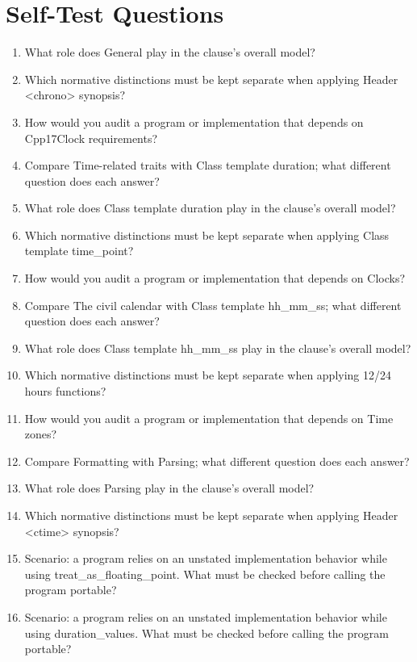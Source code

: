 \documentclass[11pt,letterpaper]{article}
\begin{document}
\section{Self-Test Questions}
\begin{enumerate}
\item What role does General play in the clause's overall model?
\item Which normative distinctions must be kept separate when applying Header <chrono> synopsis?
\item How would you audit a program or implementation that depends on Cpp17Clock requirements?
\item Compare Time-related traits with Class template duration; what different question does each answer?
\item What role does Class template duration play in the clause's overall model?
\item Which normative distinctions must be kept separate when applying Class template time\_\allowbreak{}point?
\item How would you audit a program or implementation that depends on Clocks?
\item Compare The civil calendar with Class template hh\_\allowbreak{}mm\_\allowbreak{}ss; what different question does each answer?
\item What role does Class template hh\_\allowbreak{}mm\_\allowbreak{}ss play in the clause's overall model?
\item Which normative distinctions must be kept separate when applying 12/24 hours functions?
\item How would you audit a program or implementation that depends on Time zones?
\item Compare Formatting with Parsing; what different question does each answer?
\item What role does Parsing play in the clause's overall model?
\item Which normative distinctions must be kept separate when applying Header <ctime> synopsis?
\item Scenario: a program relies on an unstated implementation behavior while using treat\_\allowbreak{}as\_\allowbreak{}floating\_\allowbreak{}point. What must be checked before calling the program portable?
\item Scenario: a program relies on an unstated implementation behavior while using duration\_\allowbreak{}values. What must be checked before calling the program portable?
\end{enumerate}
\end{document}
